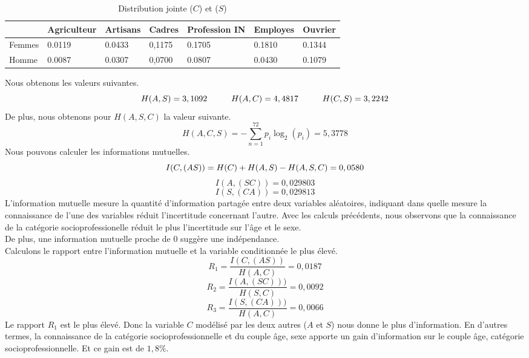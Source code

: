 \documentclass{article}
\begin{document}
\begin{table}[H]
  \centering
  \caption{Distribution jointe ($C$) et ($S$)}
  \begin{tabular}{|l|l|l|l|l|l|l|}
  \hline
         & Agriculteur & Artisans & Cadres & Profession IN & Employes & Ouvrier \\ \hline
    Femmes & 0.0119      & 0.0433   & 0,1175 & 0.1705        & 0.1810   & 0.1344  \\ \hline
    Homme  & 0.0087      & 0.0307   & 0,0700 & 0.0807        & 0.0430   & 0.1079  \\ \hline
    \end{tabular}
\end{table}
Nous obtenons les valeurs suivantes.
\[
H(A,S)=3,1092 \hspace{1 cm} H(A,C)= 4,4817 \hspace{1cm} H(C,S)=3,2242
\]
De plus, nous obtenons pour $H(A,S,C)$ la valeur suivante.
\[
  H(A,C,S) = -\sum_{n = 1}^{72}p_i\log_2(p_i)=5,3778
\]
Nous pouvons calculer les informations mutuelles.
\[
I(C,(AS))=H(C)+H(A,S)-H(A,S,C) = 0,0580 \\
\]
\[
I(A,(SC))= 0,029803
\]
\[
I(S,(CA))=0,029813
\]
L’information mutuelle mesure la quantité d’information partagée entre deux variables aléatoires, indiquant dans quelle mesure la connaissance de l’une des variables réduit l’incertitude concernant l’autre. 
Avec les calculs précédents, nous observons que la connaissance de la catégorie socioprofessionelle réduit le plus l'incertitude sur l'âge et le sexe.\\
De plus, une information mutuelle proche de 0 suggère une indépendance.\\
Calculons le rapport entre l'information mutuelle et la variable conditionnée le plus élevé.
\[
R_1 = \frac{I(C,(AS))}{H(A,C)}=0,0187
\]
\[
R_2 = \frac{I(A,(SC)))}{H(S,C)}=0,0092
\]
\[
R_3 = \frac{I(S,(CA)))}{H(A,C)}=0,0066
\]
Le rapport $R_1$ est le plus élevé. Donc la variable $C$ modélisé par les deux autres ($A$ et $S$) nous donne le plus d'information.
En d'autres termes, la connaissance de la catégorie socioprofessionnelle et du couple âge, sexe apporte un gain d'information sur le couple âge, catégorie socioprofessionnelle. Et ce gain est de $1,8\%$.
\end{document}
